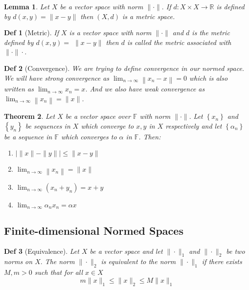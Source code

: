 \documentclass[10pt]{paper}
\newtheorem{theorem}{Theorem}[section]
\newtheorem{definition}{Def}[section]
\newtheorem{lemma}[theorem]{Lemma}
\begin{document}
\begin{lemma}
    Let $X$ be a vector space with norm $\|\cdot\| .$ If $d: X \times X \rightarrow \mathbb{R}$ is defined by $d(x, y)=\|x-y\|$ then $(X, d)$ is a metric space.
\end{lemma}

\begin{definition}[Metric]
    If $X$ is a vector space with norm $\|\cdot\|$ and $d$ is the metric defined by $d(x, y)=$ $\|x-y\|$ then $d$ is called the metric associated with $\|\cdot\| \cdot$.
\end{definition}

\begin{definition}[Convergence]
    We are trying to define convergence in our normed space. We will have strong convergence as $\lim _{n \rightarrow \infty}\left\|x_{n} - x\right\|=0$ which is also written as $\lim _{n \rightarrow \infty}x_{n}=x$. And we also have weak convergence as $\lim _{n \rightarrow \infty}\left\|x_{n}\right\|=\|x\|$.
\end{definition}

\begin{theorem}
    Let $X$ be a vector space over $\mathbb{F}$ with norm $\|\cdot\| .$ Let $\left\{x_{n}\right\}$ and $\left\{y_{n}\right\}$ be sequences in $X$ which converge to $x, y$ in $X$ respectively and let $\left\{\alpha_{n}\right\}$ be a sequence in $\mathbb{F}$ which converges to $\alpha$ in $\mathbb{F}$. Then:
    \begin{enumerate}
        \item $|\|x\|-\|y\|| \leq\|x-y\|$
        \item $\lim _{n \rightarrow \infty}\left\|x_{n}\right\|=\|x\|$
        \item $\lim _{n \rightarrow \infty}\left(x_{n}+y_{n}\right)=x+y$
        \item $\lim _{n \rightarrow \infty} \alpha_{n} x_{n}=\alpha x$
    \end{enumerate}

\end{theorem}

\subsection{Finite-dimensional Normed Spaces}
\begin{definition}[Equivalence]
    Let $X$ be a vector space and let $\|\cdot\|_{1}$ and $\|\cdot\|_{2}$ be two norms on $X .$ The norm $\|\cdot\|_{2}$ is equivalent to the norm $\|\cdot\|_{1}$ if there exists $M, m>0$ such that for all $x \in X$
    $$
        m\|x\|_{1} \leq\|x\|_{2} \leq M\|x\|_{1}
    $$
\end{definition}
\end{document}
